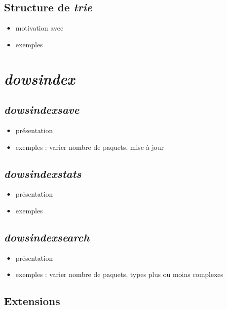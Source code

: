 \documentclass [a4paper] {report}
\theoremstyle {definition}
\newcommand {\trie} {\textit {trie}}
\newcommand {\dowsindex} {\textit {dowsindex}\xspace}
\begin{document}
\section {Structure de \trie}

\begin {itemize}
	\item motivation avec \cite {schulz}
	\item exemples
\end {itemize}


\chapter {\dowsindex}

\section {\dowsindex \textit {save}}

\begin {itemize}
	\item présentation
	\item exemples : varier nombre de paquets, mise à jour
\end {itemize}

\section {\dowsindex \textit {stats}}

\begin {itemize}
	\item présentation
	\item exemples
\end {itemize}

\section {\dowsindex \textit {search}}

\begin {itemize}
	\item présentation
	\item exemples : varier nombre de paquets, types plus ou moins complexes
\end {itemize}

\section {Extensions}
\end{document}
